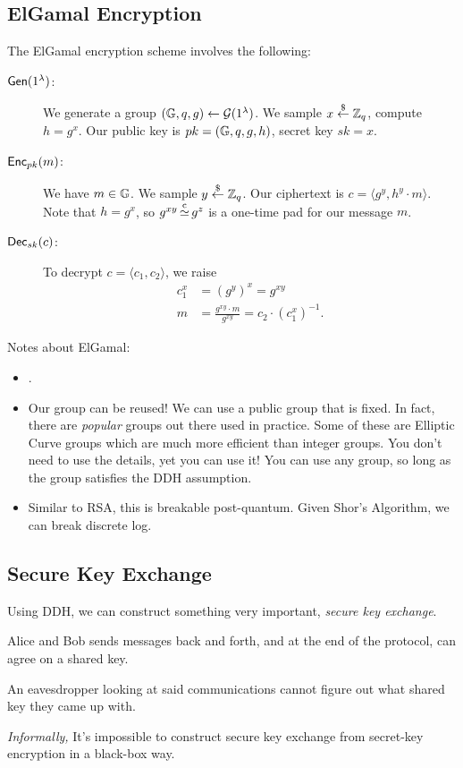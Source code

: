 \subsection{ElGamal Encryption}
The ElGamal encryption scheme involves the following:
\begin{description}
    \item[$\operatorname{\mathsf{Gen}}(1^\lambda)$:] We generate a group $(\mathbb G, q, g) \leftarrow \mathcal{G}(1^\lambda)$. We sample $x\overset{\$}{\leftarrow} \mathbb Z_q$, compute $h = g^x$. Our public key is $pk = (\mathbb G, q, g, h)$, secret key $sk = x$.
    \item[$\operatorname{\mathsf{Enc}}_{pk}(m)$:] We have $m\in\mathbb G$. We sample $y\overset{\$}{\leftarrow} \mathbb Z_q$. Our ciphertext is $c = \langle g^y, h^y\cdot m\rangle$. Note that $h = g^x$, so $g^{xy}\operatorname{\overset{c}{\simeq}} g^z$ is a one-time pad for our message $m$.
    \item[$\operatorname{\mathsf{Dec}}_{sk}(c)$:] To decrypt $c = \langle c_1, c_2\rangle$, we raise
        \begin{align*}
            c_1^x & = (g^y)^x = g^{xy}                                      \\
            m     & = \frac{g^{xy}\cdot m}{g^{xy}} = c_2\cdot (c_1^x)^{-1}.
        \end{align*}
\end{description}

Notes about ElGamal:
\begin{itemize}
    \item {}.
    \item Our group can be reused! We can use a public group that is fixed. In fact, there are \emph{popular} groups out there used in practice. Some of these are Elliptic Curve groups which are much more efficient than integer groups. You don't need to use the details, yet you can use it! You can use any group, so long as the group satisfies the DDH assumption.
    \item Similar to RSA, this is breakable post-quantum. Given Shor's Algorithm, we can break discrete log.
\end{itemize}

\subsection{Secure Key Exchange}
Using DDH, we can construct something very important, \emph{secure key exchange}.
\begin{definition}
    Alice and Bob sends messages back and forth, and at the end of the protocol, can agree on a shared key.

    An eavesdropper looking at said communications cannot figure out what shared key they came up with.
\end{definition}
\begin{theorem}
    \emph{Informally,} It's impossible to construct secure key exchange from secret-key encryption in a black-box way.
\end{theorem}

